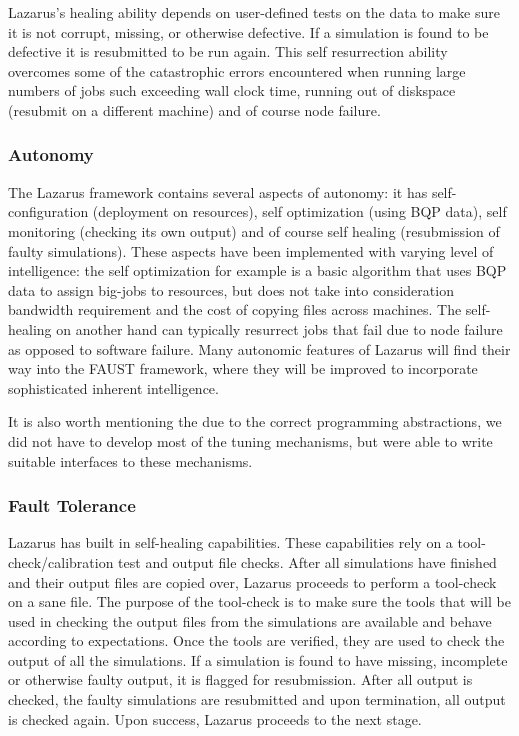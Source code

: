 \documentclass[conference,final]{IEEEtran}
\begin{document}
Lazarus's healing ability depends on
user-defined tests on the data to make sure it
is not corrupt, missing, or otherwise defective. If a simulation is
found to be defective it is resubmitted to be run again. This self
resurrection ability overcomes some of the catastrophic errors
encountered when running large numbers of jobs such exceeding wall
clock time, running out of diskspace (resubmit on a different machine)
and of course node failure.

\subsubsection{Autonomy}
The Lazarus framework contains several aspects of autonomy: it has
self-configuration (deployment on resources), self optimization (using
BQP data), self monitoring (checking its own output) and of course
self healing (resubmission of faulty simulations). These aspects have
been implemented with varying level of intelligence: the self
optimization for example is a basic algorithm that uses BQP data to
assign big-jobs to resources, but does not take into consideration
bandwidth requirement and the cost of copying files across
machines. The self-healing on another hand can typically resurrect
jobs that fail due to node failure as opposed to software
failure. Many autonomic features of Lazarus will find their way into
the FAUST framework, where they will be improved to incorporate
sophisticated inherent intelligence.  

It is also worth mentioning the due to the correct programming
abstractions, we did not have to develop most of the tuning
mechanisms, but were able to write suitable interfaces to these
mechanisms.

\subsubsection{Fault Tolerance}
Lazarus has built in self-healing capabilities. These capabilities
rely on a tool-check/calibration test and output file checks. After
all simulations have finished and their output files are copied over,
Lazarus proceeds to perform a tool-check on a sane file. The purpose
of the tool-check is to make sure the tools that will be used in
checking the output files from the simulations are available and
behave according to expectations. Once the tools are verified, they
are used to check the output of all the simulations. If a simulation
is found to have missing, incomplete or otherwise faulty output, it is
flagged for resubmission.  After all output is checked, the faulty
simulations are resubmitted and upon termination, all output is
checked again. Upon success, Lazarus proceeds to the next stage.
\end{document}
